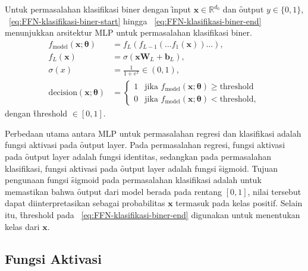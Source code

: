        
    Untuk permasalahan klasifikasi biner dengan \f{input} $\mathbf{x}\in \mathbb{R}^{d_0}$ dan \f{output} $y \in \{0, 1\}$, \equ~\ref{eq:FFN-klasifikasi-biner-start} hingga \equ~\ref{eq:FFN-klasifikasi-biner-end} menunjukkan arsitektur MLP untuk permasalahan klasifikasi biner.
    \begin{align}
        \label{eq:FFN-klasifikasi-biner-start}
        f_{\text{model}}(\mathbf{x};\bm{\theta}) &= f_L(f_{L-1}(\dots f_1(\mathbf{x})) \dots), \\
        f_L(\mathbf{x}) &= \sigma(\mathbf{x} \mathbf{W}_L + \mathbf{b}_L), \\
        \sigma(x) &= \frac{1}{1 + e^{x}} \in (0, 1), \\
        \text{decision}(\mathbf{x};\bm{\theta}) &= \begin{cases}
        1 & \text{jika } f_{\text{model}}(\mathbf{x};\bm{\theta}) \geq \text{threshold} \\
        0 & \text{jika } f_{\text{model}}(\mathbf{x};\bm{\theta}) < \text{threshold},     
        \label{eq:FFN-klasifikasi-biner-end}
        \end{cases} 
    \end{align}
dengan \f{threshold} $\in [0, 1]$.
 
    Perbedaan utama antara MLP untuk permasalahan regresi dan klasifikasi adalah fungsi aktivasi pada \f{output layer}. Pada permasalahan regresi, fungsi aktivasi pada \f{output layer} adalah fungsi identitas, sedangkan pada permasalahan klasifikasi, fungsi aktivasi pada \f{output layer} adalah fungsi \f{sigmoid}. Tujuan pengunaan fungsi \f{sigmoid} pada permasalahan klasifikasi adalah untuk memastikan bahwa \f{output} dari model berada pada rentang $[0, 1]$, nilai tersebut dapat diinterpretasikan sebagai probabilitas $\mathbf{x}$ termasuk pada kelas positif. Selain itu, \f{threshold} pada \equ~\ref{eq:FFN-klasifikasi-biner-end} digunakan untuk menentukan kelas dari $\mathbf{x}$.

    \subsection{Fungsi Aktivasi}

